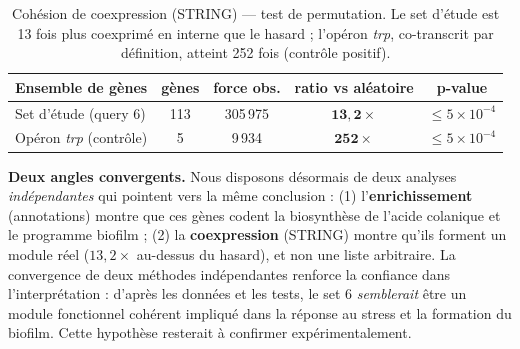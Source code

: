 \documentclass[a4paper,11pt,openright]{report}
\begin{document}
\begin{table}[h]
\centering
\begin{tabular}{lcccc}
\hline
\textbf{Ensemble de gènes} & \textbf{gènes} & \textbf{force obs.} & \textbf{ratio vs aléatoire} & \textbf{p-value} \\
\hline
Set d'étude (query 6)   & 113 & 305\,975 & $\mathbf{13{,}2\times}$  & $\leq 5\times10^{-4}$ \\
Opéron \textit{trp} (contrôle) & 5 & 9\,934 & $\mathbf{252\times}$ & $\leq 5\times10^{-4}$ \\
\hline
\end{tabular}
\caption{Cohésion de coexpression (STRING) --- test de permutation. Le set d'étude est 13 fois plus coexprimé en interne que le hasard ; l'opéron \textit{trp}, co-transcrit par définition, atteint 252 fois (contrôle positif).}
\label{tab:coexpr}
\end{table}

\textbf{Deux angles convergents.} Nous disposons désormais de deux analyses \textit{indépendantes} qui pointent vers la même conclusion : (1) l'\textbf{enrichissement} (annotations) montre que ces gènes codent la biosynthèse de l'acide colanique et le programme biofilm ; (2) la \textbf{coexpression} (STRING) montre qu'ils forment un module réel ($13{,}2\times$ au-dessus du hasard), et non une liste arbitraire. La convergence de deux méthodes indépendantes renforce la confiance dans l'interprétation : d'après les données et les tests, le set 6 \textit{semblerait} être un module fonctionnel cohérent impliqué dans la réponse au stress et la formation du biofilm. Cette hypothèse resterait à confirmer expérimentalement.

\end{document}
